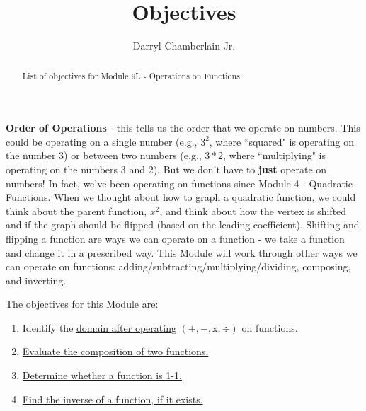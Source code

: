 \documentclass{ximera}
\author{Darryl Chamberlain Jr.}
\title{Objectives}
\begin{document}
\begin{abstract}
List of objectives for Module 9L - Operations on Functions.
\end{abstract}
\maketitle

\textbf{Order of Operations} - this tells us the order that we operate on numbers. This could be operating on a single number (e.g., $3^2$, where ``squared" is operating on the number $3$) or between two numbers (e.g., $3*2$, where ``multiplying" is operating on the numbers $3$ and $2$). But we don't have to \textbf{just} operate on numbers! In fact, we've been operating on functions since Module 4 - Quadratic Functions. When we thought about how to graph a quadratic function, we could think about the parent function, $x^2$, and think about how the vertex is shifted and if the graph should be flipped (based on the leading coefficient). Shifting and flipping a function are ways we can operate on a function - we take a function and change it in a prescribed way. This Module will work through other ways we can operate on functions: adding/subtracting/multiplying/dividing, composing, and inverting. 



The objectives for this Module are: 
\begin{enumerate}
    \item Identify the \href{https://cnx.org/contents/mwjClAV_@8.1:ik_Ed0Pa@12/Composition-of-Functions}{domain after operating} $(+, -, \text{x}, \div)$ on functions.
    \item \href{https://cnx.org/contents/mwjClAV_@8.1:ik_Ed0Pa@12/Composition-of-Functions}{Evaluate the composition of two functions.}
    \item \href{https://cnx.org/contents/mwjClAV_@8.1:9ZKq0BnY@15/Inverse-Functions}{Determine whether a function is 1-1.}
    \item \href{https://cnx.org/contents/mwjClAV_@8.1:9ZKq0BnY@15/Inverse-Functions}{Find the inverse of a function, if it exists.}
\end{enumerate}
\end{document}
